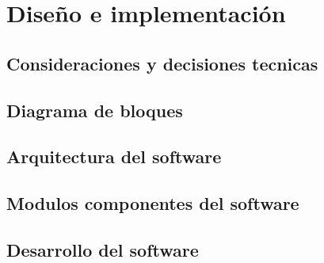 \chapter{Diseño e implementación} %

\label{Chapter3}



\section{Consideraciones y decisiones tecnicas}
\label{sec:consideraciones_decisiones_tecnicas}

\section{Diagrama de bloques}
\label{sec:diag_bloques}

\section{Arquitectura del software}
\label{sec:arquitectura_software}

\section{Modulos componentes del software}
\label{sec:modulos_componentes_software}


\section{Desarrollo del software}
\label{sec:desarrollo_software}

